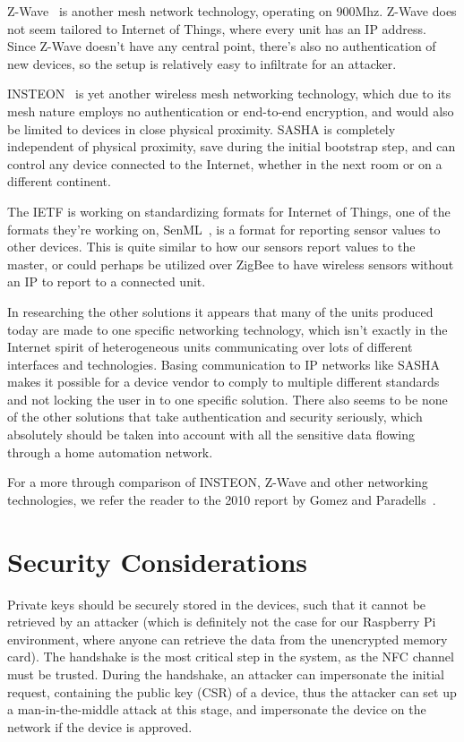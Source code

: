 Z-Wave~\cite[Annex~A]{z-wave} is another mesh network technology, operating on 900Mhz. Z-Wave does not seem tailored to Internet of Things, where every unit has an IP address. Since Z-Wave doesn't have any central point, there's also no authentication of new devices, so the setup is relatively easy to infiltrate for an attacker.

INSTEON~\cite{insteon} is yet another wireless mesh networking technology, which due to its mesh nature employs no authentication or end-to-end encryption, and would also be limited to devices in close physical proximity. SASHA is completely independent of physical proximity, save during the initial bootstrap step, and can control any device connected to the Internet, whether in the next room or on a different continent.

The IETF is working on standardizing formats for Internet of Things, one of the formats they're working on, SenML~\cite{senml}, is a format for reporting sensor values to other devices. This is quite similar to how our sensors report values to the master, or could perhaps be utilized over ZigBee to have wireless sensors without an IP to report to a connected unit.

In researching the other solutions it appears that many of the units produced today are made to one specific networking technology, which isn't exactly in the Internet spirit of heterogeneous units communicating over lots of different interfaces and technologies. Basing communication to IP networks like SASHA makes it possible for a device vendor to comply to multiple different standards and not locking the user in to one specific solution. There also seems to be none of the other solutions that take authentication and security seriously, which absolutely should be taken into account with all the sensitive data flowing through a home automation network.

For a more through comparison of INSTEON, Z-Wave and other networking technologies, we refer the reader to the 2010 report by Gomez and Paradells~\cite{comparison-of-technologies}.


\section{Security Considerations}

Private keys should be securely stored in the devices, such that it cannot be retrieved by an attacker (which is definitely not the case for our Raspberry Pi environment, where anyone can retrieve the data from the unencrypted memory card).
The handshake is the most critical step in the system, as the NFC channel must be trusted. During the handshake, an attacker can impersonate the initial request, containing the public key (CSR) of a device, thus the attacker can set up a man-in-the-middle attack at this stage, and impersonate the device on the network if the device is approved.
